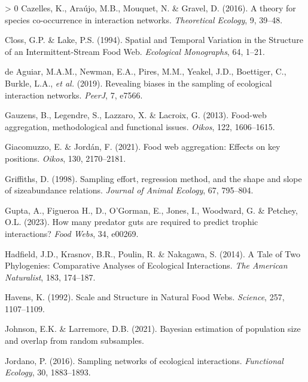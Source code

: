 \documentclass[11pt]{article}
\newlength{\cslhangindent}
\newenvironment{CSLReferences}[3] %
 {%
  \setlength{\parindent}{0pt}
  \ifodd #1 \everypar{\setlength{\hangindent}{\cslhangindent}}\ignorespaces\fi
  \ifnum #2 > 0
  \setlength{\parskip}{#2\baselineskip}
  \fi
 }%
 {}
\begin{document}
\begin{CSLReferences}{1}{0}
\leavevmode\hypertarget{ref-Cazelles2016TheSpe}{}%
Cazelles, K., Araújo, M.B., Mouquet, N. \& Gravel, D. (2016). A theory
for species co-occurrence in interaction networks. \emph{Theoretical
Ecology}, 9, 39--48.

\leavevmode\hypertarget{ref-Closs1994SpaTem}{}%
Closs, G.P. \& Lake, P.S. (1994). Spatial and Temporal Variation in the
Structure of an Intermittent-Stream Food Web. \emph{Ecological
Monographs}, 64, 1--21.

\leavevmode\hypertarget{ref-deAguiar2019RevBia}{}%
de Aguiar, M.A.M., Newman, E.A., Pires, M.M., Yeakel, J.D., Boettiger,
C., Burkle, L.A., \emph{et al.} (2019). Revealing biases in the sampling
of ecological interaction networks. \emph{PeerJ}, 7, e7566.

\leavevmode\hypertarget{ref-Gauzens2013FooAgg}{}%
Gauzens, B., Legendre, S., Lazzaro, X. \& Lacroix, G. (2013). Food-web
aggregation, methodological and functional issues. \emph{Oikos}, 122,
1606--1615.

\leavevmode\hypertarget{ref-Giacomuzzo2021FooWeb}{}%
Giacomuzzo, E. \& Jordán, F. (2021). Food web aggregation: Effects on
key positions. \emph{Oikos}, 130, 2170--2181.

\leavevmode\hypertarget{ref-Griffiths1998SamEff}{}%
Griffiths, D. (1998). Sampling effort, regression method, and the shape
and slope of sizeabundance relations. \emph{Journal of Animal Ecology},
67, 795--804.

\leavevmode\hypertarget{ref-Gupta2023HowMan}{}%
Gupta, A., Figueroa H., D., O'Gorman, E., Jones, I., Woodward, G. \&
Petchey, O.L. (2023). How many predator guts are required to predict
trophic interactions? \emph{Food Webs}, 34, e00269.

\leavevmode\hypertarget{ref-Hadfield2014TalTwo}{}%
Hadfield, J.D., Krasnov, B.R., Poulin, R. \& Nakagawa, S. (2014). A Tale
of Two Phylogenies: Comparative Analyses of Ecological Interactions.
\emph{The American Naturalist}, 183, 174--187.

\leavevmode\hypertarget{ref-Havens1992ScaStr}{}%
Havens, K. (1992). Scale and Structure in Natural Food Webs.
\emph{Science}, 257, 1107--1109.

\leavevmode\hypertarget{ref-Johnson2021BayEst}{}%
Johnson, E.K. \& Larremore, D.B. (2021). Bayesian estimation of
population size and overlap from random subsamples.

\leavevmode\hypertarget{ref-Jordano2016SamNet}{}%
Jordano, P. (2016). Sampling networks of ecological interactions.
\emph{Functional Ecology}, 30, 1883--1893.


\end{CSLReferences}
\end{document}
